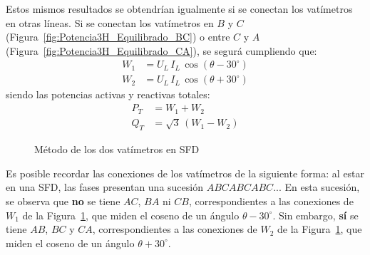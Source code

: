 Estos mismos resultados se obtendrían igualmente si se conectan los vatímetros en otras líneas. Si se conectan los vatímetros en $B$ y $C$ (Figura~\ref{fig:Potencia3H_Equilibrado_BC}) o entre $C$ y $A$ (Figura~\ref{fig:Potencia3H_Equilibrado_CA}), se segurá cumpliendo que: 
\begin{align*}
    W_1&=U_L\,I_L\,\cos(\theta-30^\circ) \\
    W_2&=U_L\,I_L\,\cos(\theta+30^\circ)
\end{align*}
siendo las potencias activas y reactivas totales: 
\begin{align*}
    P_T&=W_1 + W_2\\
    Q_T&=\sqrt{3}\,(W_1 - W_2)
\end{align*}
\begin{figure}[H]
    \centering{}\hfill
    \hfill
    \caption{Método de los dos vatímetros en SFD}
    \label{fig:potencia3H_equilibrado_SFD}
\end{figure}

\begin{remark}
    Es posible recordar las conexiones de los vatímetros de la siguiente forma: al estar en una SFD, las fases presentan una sucesión $ABCABCABC$... En esta sucesión, se observa que {\color{red}\textbf{no}} se tiene $AC$, $BA$ ni $CB$, correspondientes a las conexiones de $W_1$ de la Figura~\ref{fig:potencia3H_equilibrado_SFD}, que miden el coseno de un ángulo $\theta-30^\circ$. Sin embargo, {\color{red}\textbf{sí}} se tiene $AB$, $BC$ y $CA$, correspondientes a las conexiones de $W_2$ de la Figura~\ref{fig:potencia3H_equilibrado_SFD}, que miden el coseno de un ángulo $\theta+30^\circ$.
\end{remark}
  
